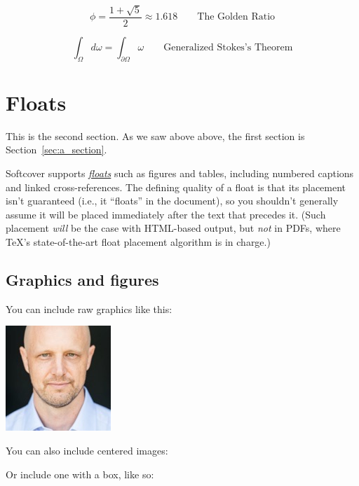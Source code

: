 \begin{equation}
\label{eq:golden_ratio}
\phi = \frac{1+\sqrt{5}}{2} \approx 1.618 \qquad{\text{The Golden Ratio}}
\end{equation}

\begin{equation}
\label{eq:stokes_theorem}
\int_\Omega d\omega = \int_{\partial\Omega} \omega \qquad{\text{Generalized Stokes's Theorem}}
\end{equation}

\section{Floats}
\label{sec:floats}

This is the second section. As we saw above above, the first section is Section~\ref{sec:a_section}.

Softcover supports \href{http://en.wikibooks.org/wiki/LaTeX/Floats,_Figures_and_Captions}{\emph{floats}} such as figures and tables, including numbered captions and linked cross-references. The defining quality of a float is that its placement isn't guaranteed (i.e., it ``floats'' in the document), so you shouldn't generally assume it will be placed immediately after the text that precedes it. (Such placement \emph{will} be the case with HTML-based output, but \emph{not} in PDFs, where \TeX's state-of-the-art float placement algorithm is in charge.)

\subsection{Graphics and figures}
\label{sec:graphics_and_figures}

You can include raw graphics like this:

\includegraphics{images/figures/01_michael_hartl_headshot.jpg}

\noindent You can also include centered images:


\noindent Or include one with a box, like so:

